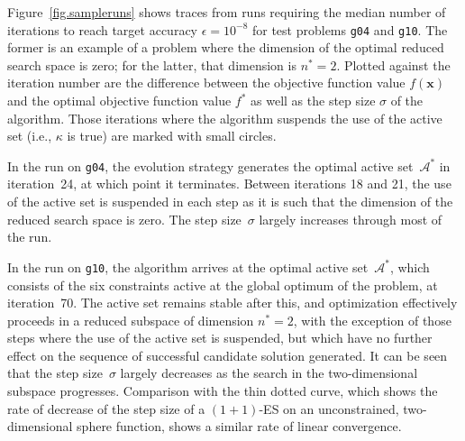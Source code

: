 \documentclass[oribibl]{llncs}
\newcommand{\x}{\ensuremath{\mathbf{x}}}
\begin{document}
Figure~\ref{fig.sampleruns} shows traces from runs requiring the median number of iterations to reach target accuracy $\epsilon=10^{-8}$ for test problems \texttt{g04} and \texttt{g10}. The former is an example of a problem where the dimension of the optimal reduced search space is zero; for the latter, that dimension is $n^*=2$. Plotted against the iteration number are the difference between the objective function value $f(\x)$ and the optimal objective function value $f^*$ as well as the step size $\sigma$ of the algorithm. Those iterations where the algorithm suspends the use of the active set (i.e., $\kappa$ is true) are marked with small circles.

In the run on \texttt{g04}, the evolution strategy generates the optimal active set~$\mathcal{A}^*$ in iteration~24, at which point it terminates. Between iterations 18 and 21, the use of the active set is suspended in each step as it is such that the dimension of the reduced search space is zero. The step size~$\sigma$ largely increases through most of the run.

In the run on \texttt{g10}, the algorithm arrives at the optimal active set~$\mathcal{A}^*$, which consists of the six constraints active at the global optimum of the problem, at iteration~70. The active set remains stable after this, and optimization effectively proceeds in a reduced subspace of dimension $n^*=2$, with the exception of those steps where the use of the active set is suspended, but which have no further effect on the sequence of successful candidate solution generated. It can be seen that the step size~$\sigma$ largely decreases as the search in the two-dimensional subspace progresses. Comparison with the thin dotted curve, which shows the rate of decrease of the step size of a $(1+1)$-ES on an unconstrained, two-dimensional sphere function, shows a similar rate of linear convergence.
\end{document}

